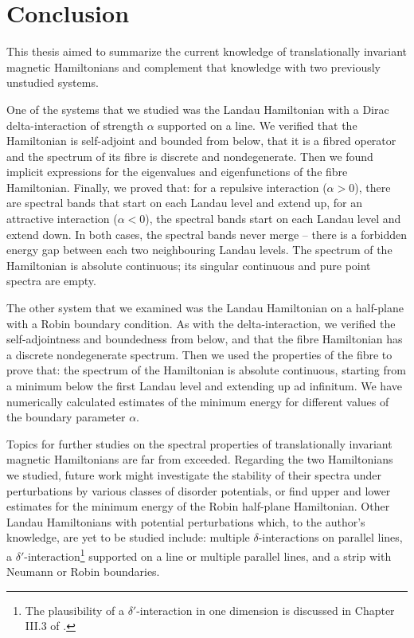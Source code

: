 \chapter*{Conclusion}

This thesis aimed to summarize the current knowledge of translationally invariant magnetic Hamiltonians and complement that knowledge with two previously unstudied systems.

One of the systems that we studied was the Landau Hamiltonian with a Dirac delta-interaction of strength $\alpha$ supported on a line. We verified that the Hamiltonian is self-adjoint and bounded from below, that it is a fibred operator and the spectrum of its fibre is discrete and nondegenerate. Then we found implicit expressions for the eigenvalues and eigenfunctions of the fibre Hamiltonian. Finally, we proved that: for a repulsive interaction ($\alpha>0$), there are spectral bands that start on each Landau level and extend up, for an attractive interaction ($\alpha < 0$), the spectral bands start on each Landau level and extend down. In both cases, the spectral bands never merge – there is a forbidden energy gap between each two neighbouring Landau levels. The spectrum of the Hamiltonian is absolute continuous; its singular continuous and pure point spectra are empty.

The other system that we examined was the Landau Hamiltonian on a half-plane with a Robin boundary condition. As with the delta-interaction, we verified the self-adjointness and boundedness from below, and that the fibre Hamiltonian has a discrete nondegenerate spectrum. Then we used the properties of the fibre to prove that: the spectrum of the Hamiltonian is absolute continuous, starting from a minimum below the first Landau level and extending up ad infinitum. We have numerically calculated estimates of the minimum energy for different values of the boundary parameter $\alpha$.

Topics for further studies on the spectral properties of translationally invariant magnetic Hamiltonians are far from exceeded. Regarding the two Hamiltonians we studied, future work might investigate the stability of their spectra under perturbations by various classes of disorder potentials, or find upper and lower estimates for the minimum energy of the Robin half-plane Hamiltonian. Other Landau Hamiltonians with potential perturbations which, to the author's knowledge, are yet to be studied include: multiple $\delta$-interactions on parallel lines, a $\delta'$-interaction\footnote{The plausibility of a $\delta'$-interaction in one dimension is discussed in Chapter III.3 of \cite{Albeverio2005}.} supported on a line or multiple parallel lines, and a strip with Neumann or Robin boundaries.
